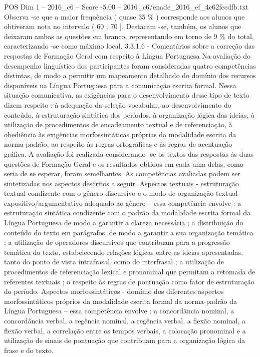 \begin{textsample}{POS Dim 1 – 2016\_c6 – Score -5.00 – 2016\_c6/enade\_2016\_ef\_4c62fccdfb.txt}
Observa -se que a maior frequência ( quase 35 \% ) corresponde aos alunos que obtiveram nota no intervalo ( 60 ; 70 ].
Destacam -se, também, os alunos que deixaram ambas as questões em branco, representando em torno de 9 \% do total, caracterizando -se como máximo local. 3.3.1.6 - Comentários sobre a correção das respostas de Formação Geral com respeito à Língua Portuguesa Na avaliação do desempenho linguístico dos participantes foram consideradas quatro competências distintas, de modo a permitir um mapeamento detalhado do domínio dos recursos disponíveis na Língua Portuguesa para a comunicação escrita formal.
Nessa situação comunicativa, as exigências para o desenvolvimento desse tipo de texto dizem respeito : à adequação da seleção vocabular, ao desenvolvimento do conteúdo, à estruturação sintática dos períodos, à organização lógica das ideias, à utilização de procedimentos de encadeamento textual e de referenciação, à obediência às exigências morfossintáticas próprias da modalidade escrita da norma-padrão, ao respeito às regras ortográficas e às regras de acentuação gráfica.
A avaliação foi realizada considerando -se os textos das respostas às duas questões de Formação Geral e os resultados obtidos em cada uma delas, como seria de se esperar, foram semelhantes.
As competências avaliadas podem ser sintetizadas nos aspectos descritos a seguir.
Aspectos textuais - estruturação textual condizente com o gênero discursivo e o modo de organização textual expositivo/argumentativo adequado ao gênero – essa competência envolve : a estruturação sintática condizente com o padrão da modalidade escrita formal da Língua Portuguesa de modo a garantir a clareza necessária ; a distribuição do conteúdo do texto em parágrafos, de modo a garantir a sua organização temática ; a utilização de operadores discursivos que contribuam para a progressão temática do texto, estabelecendo relações lógicas entre as ideias apresentadas, tanto do ponto de vista intrafrasal, como do interfrasal ; a utilização de procedimentos de referenciação lexical e pronominal que permitam a retomada de referentes textuais ; o respeito às regras de pontuação como fator de estruturação do período.
Aspectos morfossintáticos - domínio dos diferentes aspectos morfossintáticos próprios da modalidade escrita formal da norma-padrão da Língua Portuguesa – essa competência envolve : a concordância nominal, a concordância verbal, a regência nominal, a regência verbal, a flexão nominal, a flexão verbal, a correlação entre os tempos verbais, a colocação pronominal e a utilização de sinais de pontuação que contribuam para a organização lógica da frase e do texto.

\end{textsample}
